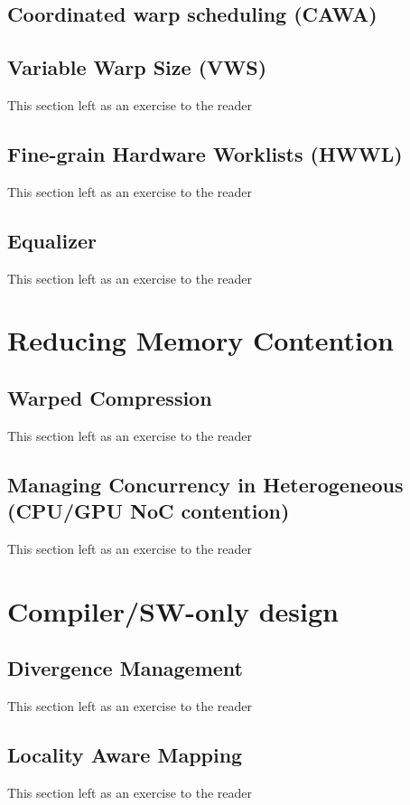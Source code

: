 \documentclass[prodmode,acmtecs]{acmsmall} %
\begin{document}
\subsection{Coordinated warp scheduling (CAWA)}

\subsection{Variable Warp Size (VWS)}
This section left as an exercise to the reader

\subsection{Fine-grain Hardware Worklists (HWWL)}
This section left as an exercise to the reader

\subsection{Equalizer}
This section left as an exercise to the reader

\section{Reducing Memory Contention} \label{sec:memory}
\subsection{Warped Compression}
This section left as an exercise to the reader

\subsection{Managing Concurrency in Heterogeneous (CPU/GPU NoC contention)}
This section left as an exercise to the reader

\section{Compiler/SW-only design} \label{sec:software}
\subsection{Divergence Management}
This section left as an exercise to the reader

\subsection{Locality Aware Mapping}
This section left as an exercise to the reader
\end{document}
